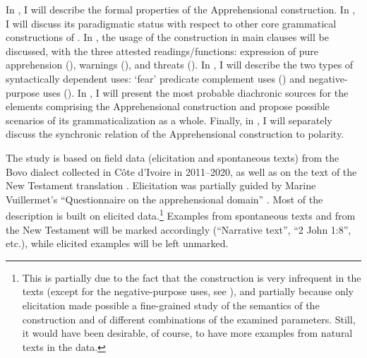 \documentclass[output=paper,colorlinks,citecolor=brown]{langscibook}
\begin{document}
In , I will describe the formal properties of the Apprehensional construction. In , I will discuss its paradigmatic status with respect to other core grammatical constructions of . In , the usage of the construction in main clauses will be discussed, with the three attested readings\slash functions: expression of pure apprehension (), warnings (), and threats (). In , I will describe the two types of syntactically dependent uses: `fear' predicate complement uses () and negative-purpose uses (). In , I will present the most probable diachronic sources for the elements comprising the Apprehensional construction and propose possible scenarios of its grammaticalization as a whole. Finally, in , I will separately discuss the synchronic relation of the Apprehensional construction to polarity.


The study is based on field data (elicitation and spontaneous texts) from the Bovo dialect collected in Côte d'Ivoire in 2011--2020, as well as on the text of the New Testament translation \citep{gbanNT}. Elicitation was partially guided by Marine Vuillermet's ``Questionnaire on the apprehensional domain'' \citep{chapters/vuillermet}. Most of the description is built on elicited data.\footnote{This is partially due to the fact that the construction is very infrequent in the texts (except for the negative-purpose uses, see ), and partially because only elicitation made possible a fine-grained study of the semantics of the construction and of different combinations of the examined parameters. Still, it would have been desirable, of course, to have more examples from natural texts in the data.} Examples from spontaneous texts and from the New Testament will be marked accordingly (``Narrative text'', ``2 John 1:8'', etc.), while elicited examples will be left unmarked.
\end{document}
